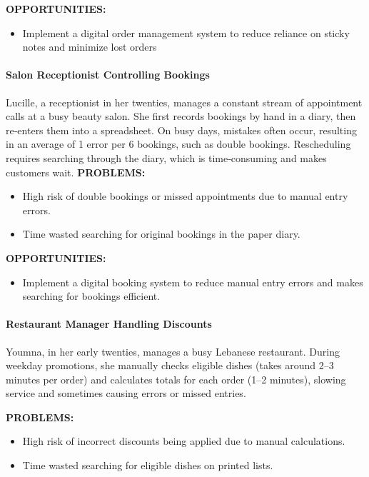 \documentclass[]{VUMIFTemplateClass}
\newcommand{\todocomment}[1]{%
    \begin{tcolorbox}[colback=red!20, colframe=red!60, arc=0pt, outer arc=0pt, boxrule=1pt, left=3pt, right=3pt, top=3pt, bottom=3pt]
        \textbf{\textcolor{orange!70!black}{TODO:}} #1
    \end{tcolorbox}
}
\newcommand{\subsubsubsection}[1]{\paragraph{#1}}
\begin{document}
\textbf{OPPORTUNITIES:}

\begin{itemize}
    \item Implement a digital order management system to reduce reliance on sticky notes and minimize lost orders
\end{itemize}


\subsubsubsection{Salon Receptionist Controlling Bookings}
\label{subsubsubsec:salon-receptionist}

Lucille, a receptionist in her twenties, manages a constant stream of appointment calls at a busy beauty salon. She first records bookings by hand in a diary, then re‑enters them into a spreadsheet. On busy days, mistakes often occur, resulting in an average of 1 error per 6 bookings, such as double bookings. Rescheduling requires searching through the diary, which is time‑consuming and makes customers wait. 
\textbf{PROBLEMS:}

\begin{itemize}
    \item High risk of double bookings or missed appointments due to manual entry errors.
    \item Time wasted searching for original bookings in the paper diary.
\end{itemize}

\textbf{OPPORTUNITIES:}
\begin{itemize}
    \item Implement a digital booking system to reduce manual entry errors and
    makes searching for bookings efficient.
\end{itemize}


\subsubsubsection{Restaurant Manager Handling Discounts}
\label{subsubsubsec:restaurant-discounts}

Youmna, in her early twenties, manages a busy Lebanese restaurant. During weekday promotions, she manually checks eligible dishes (takes around 2–3 minutes per order) and calculates totals for each order (1–2 minutes), slowing service and sometimes causing errors or missed entries.

\textbf{PROBLEMS:}

\begin{itemize}
    \item High risk of incorrect discounts being applied due to manual calculations.
    \item Time wasted searching for eligible dishes on printed lists.
\end{itemize}
\end{document}
